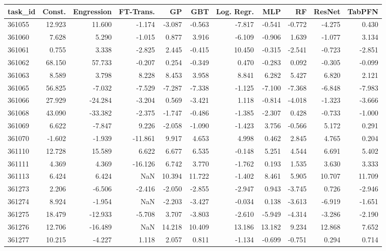 \begin{tabular}{lrrrrrrrrrr}
\toprule
task\_id & Const. & Engression & FT-Trans. & GP & GBT & Log. Regr. & MLP & RF & ResNet & TabPFN \\
\midrule
361055 & 12.923 & 11.600 & -1.174 & -3.087 & -0.563 & -7.817 & -0.541 & -0.772 & -4.275 & 0.430 \\
361060 & 7.628 & 5.290 & -1.015 & 0.877 & 3.916 & -6.109 & -0.906 & 1.639 & -1.077 & 3.134 \\
361061 & 0.755 & 3.338 & -2.825 & 2.445 & -0.415 & 10.450 & -0.315 & -2.541 & -0.723 & -2.851 \\
361062 & 68.150 & 57.733 & -0.207 & 0.254 & -0.349 & 0.470 & -0.283 & 0.092 & -0.305 & -0.099 \\
361063 & 8.589 & 3.798 & 8.228 & 8.453 & 3.958 & 8.841 & 6.282 & 5.427 & 6.820 & 2.121 \\
361065 & 56.825 & -7.032 & -7.529 & -7.287 & -7.338 & -1.125 & -7.100 & -7.368 & -6.848 & -7.983 \\
361066 & 27.929 & -24.284 & -3.204 & 0.569 & -3.421 & 1.118 & -0.814 & -4.018 & -1.323 & -3.666 \\
361068 & 43.090 & -33.382 & -2.375 & -1.747 & -0.486 & -1.385 & -2.307 & 0.428 & -0.733 & -1.000 \\
361069 & 6.622 & -7.847 & 9.226 & -2.058 & -1.090 & -1.423 & 3.756 & -0.566 & 5.172 & 0.291 \\
361070 & -1.602 & -1.939 & -11.861 & 9.917 & 4.653 & 4.998 & 0.462 & 2.845 & 4.765 & 0.204 \\
361110 & 12.728 & 15.589 & 6.622 & 6.677 & 6.535 & -0.148 & 5.251 & 4.544 & 6.691 & 5.402 \\
361111 & 4.369 & 4.369 & -16.126 & 6.742 & 3.770 & -1.762 & 0.193 & 1.535 & 3.630 & 3.333 \\
361113 & 6.424 & 6.424 & NaN & 10.394 & 11.722 & -1.402 & 8.461 & 5.905 & 10.707 & 11.709 \\
361273 & 2.206 & -6.506 & -2.416 & -2.050 & -2.855 & -2.947 & 0.943 & -3.745 & 0.726 & -2.946 \\
361274 & 8.924 & -1.954 & NaN & -2.203 & -3.427 & -0.034 & 0.138 & -3.613 & -6.919 & -1.651 \\
361275 & 18.479 & -12.933 & -5.708 & 3.707 & -3.803 & -2.610 & -5.949 & -4.314 & -3.286 & -2.190 \\
361276 & 12.706 & -16.489 & NaN & 14.218 & 10.409 & 13.186 & 13.182 & 9.234 & 12.868 & 7.652 \\
361277 & 10.215 & -4.227 & 1.118 & 2.057 & 0.811 & -1.134 & -0.699 & -0.751 & 0.294 & 0.714 \\

\end{tabular}
